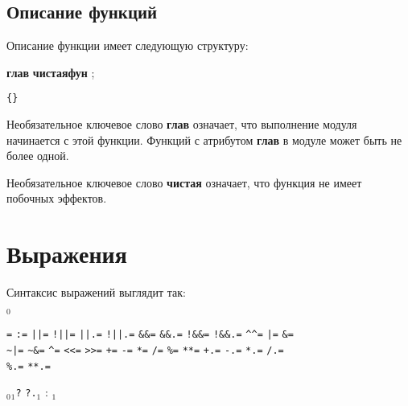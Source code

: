 \documentclass[10pt]{report}
\begin{document}
\is{}

\is{}


\section{Описание функций}
Описание функции имеет следующую структуру:

\is\rbo\textbf{глав} \sor \textbf{чистая}\rbc\optional \textbf{фун}  \rbo;\sor{}\rbc

\is\texttt{\{}\rbo{}\sor{}\rbc\kleene\texttt{\}}

\is{}

Необязательное ключевое слово \textbf{глав} означает, что выполнение модуля начинается с этой функции. Функций с атрибутом \textbf{глав} в модуле может быть не более одной.

Необязательное ключевое слово \textbf{чистая} означает, что функция не имеет побочных эффектов.   


\chapter{Выражения}
Синтаксис выражений выглядит так:

\is{}$_0$\rbo{} \rbc\optional

\is\texttt{=} \sor \texttt{:=} \sor \texttt{||=} \sor \texttt{!||=} \sor \texttt{||.=} \sor \texttt{!||.=} \sor \texttt{\&\&=} \sor \texttt{\&\&.=} \sor \texttt{!\&\&=} \sor \texttt{!\&\&.=} \sor \texttt{\^{ }\^{ }=} \sor \texttt{|=} \sor \texttt{\&=} \sor \\
\phantom{операция_присваивания88888} \texttt{\~{ }|=} \sor \texttt{\~{ }\&=} \sor \texttt{\^{ }=} \sor \texttt{<{}<=} \sor \texttt{>{}>=} \sor \texttt{+=} \sor \texttt{-=} \sor \texttt{*=} \sor \texttt{/=} \sor \texttt{\%=} \sor \texttt{**=} \sor \texttt{+.=} \sor \texttt{-.=} \sor \texttt{*.=} \sor \texttt{/.=} \sor\\
\phantom{операция_присваивания88888} \texttt{\%.=} \sor \texttt{**.=} 

$_0$\is{}$_1$\rbo\rbo\texttt{?} \sor \texttt{?.}\rbc{}$_1$ : $_1$\rbc\optional
\end{document}
